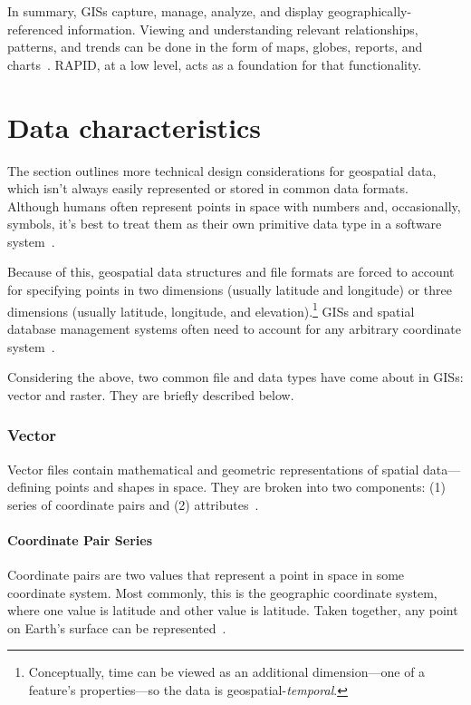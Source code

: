 In summary, GISs capture, manage, analyze, and display geographically-referenced information. Viewing and understanding relevant relationships, patterns, and trends can be done in the form of maps, globes, reports, and charts~\cite{Esriintro}. RAPID, at a low level, acts as a foundation for that functionality.

\section{Data characteristics}
The section outlines more technical design considerations for geospatial data, which isn't always easily represented or stored in common data formats. Although humans often represent points in space with numbers and, occasionally, symbols, it's best to treat them as their own primitive data type in a software system~\cite{gentle_intro}.

Because of this, geospatial data structures and file formats are forced to account for specifying points in two dimensions (usually latitude and longitude) or three dimensions (usually latitude, longitude, and elevation).\footnote{Conceptually, time can be viewed as an additional dimension---one of a feature's properties---so the data is geospatial-\textit{temporal}.} GISs and spatial database management systems often need to account for any arbitrary coordinate system~\cite{gentle_intro}.

Considering the above, two common file and data types have come about in GISs: vector and raster. They are briefly described below.

\subsubsection{Vector}
\label{sec:vector}
Vector files contain mathematical and geometric representations of spatial data---defining points and shapes in space. They are broken into two components: (1) series of coordinate pairs and (2) attributes~\cite{gentle_intro}.

\paragraph{Coordinate Pair Series}
Coordinate pairs are two values that represent a point in space in some coordinate system. Most commonly, this is the geographic coordinate system, where one value is latitude and other value is latitude. Taken together, any point on Earth's surface can be represented~\cite{gentle_intro}.

